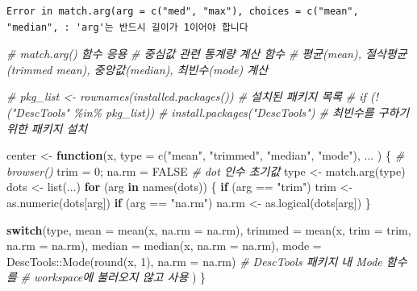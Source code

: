\documentclass[
  11pt,
]{krantz}
\newenvironment{Shaded}{\begin{snugshade}}{\end{snugshade}}
\newcommand{\AttributeTok}[1]{\textcolor[rgb]{0.61,0.61,0.61}{#1}}
\newcommand{\CommentTok}[1]{\textcolor[rgb]{0.37,0.37,0.37}{\textit{#1}}}
\newcommand{\ConstantTok}[1]{\textcolor[rgb]{0,0,0}{#1}}
\newcommand{\ControlFlowTok}[1]{\textcolor[rgb]{0.27,0.27,0.27}{\textbf{#1}}}
\newcommand{\DecValTok}[1]{\textcolor[rgb]{0.06,0.06,0.06}{#1}}
\newcommand{\FunctionTok}[1]{\textcolor[rgb]{0,0,0}{#1}}
\newcommand{\NormalTok}[1]{#1}
\newcommand{\OtherTok}[1]{\textcolor[rgb]{0.37,0.37,0.37}{#1}}
\newcommand{\SpecialCharTok}[1]{\textcolor[rgb]{0,0,0}{#1}}
\newcommand{\StringTok}[1]{\textcolor[rgb]{0.5,0.5,0.5}{#1}}
\begin{document}
\begin{verbatim}
Error in match.arg(arg = c("med", "max"), choices = c("mean", "median", : 'arg'는 반드시 길이가 1이어야 합니다
\end{verbatim}

\normalsize

\footnotesize

\begin{Shaded}
\begin{Highlighting}[]
\CommentTok{\# match.arg() 함수 응용}
\CommentTok{\# 중심값 관련 통계량 계산 함수}
\CommentTok{\# 평균(mean), 절삭평균(trimmed mean), 중앙값(median), 최빈수(mode) 계산}

\CommentTok{\# pkg\_list \textless{}{-} rownames(installed.packages()) \# 설치된 패키지 목록}
\CommentTok{\# if (!("DescTools" \%in\% pkg\_list)) }
\CommentTok{\#   install.packages("DescTools") \# 최빈수를 구하기 위한 패키지 설치}

\NormalTok{center }\OtherTok{\textless{}{-}} \ControlFlowTok{function}\NormalTok{(x, }
                   \AttributeTok{type =} \FunctionTok{c}\NormalTok{(}\StringTok{"mean"}\NormalTok{, }\StringTok{"trimmed"}\NormalTok{, }\StringTok{"median"}\NormalTok{, }\StringTok{"mode"}\NormalTok{), }
\NormalTok{                   ...}
\NormalTok{                   ) }
\NormalTok{\{}
  \CommentTok{\# browser()}
\NormalTok{  trim }\OtherTok{=} \DecValTok{0}\NormalTok{; na.rm }\OtherTok{=} \ConstantTok{FALSE} \CommentTok{\# dot 인수 초기값}
\NormalTok{  type }\OtherTok{\textless{}{-}} \FunctionTok{match.arg}\NormalTok{(type)}
\NormalTok{  dots }\OtherTok{\textless{}{-}} \FunctionTok{list}\NormalTok{(...)}
  \ControlFlowTok{for}\NormalTok{ (arg }\ControlFlowTok{in} \FunctionTok{names}\NormalTok{(dots)) \{}
    \ControlFlowTok{if}\NormalTok{ (arg }\SpecialCharTok{==} \StringTok{"trim"}\NormalTok{) trim }\OtherTok{\textless{}{-}} \FunctionTok{as.numeric}\NormalTok{(dots[arg])}
    \ControlFlowTok{if}\NormalTok{ (arg }\SpecialCharTok{==} \StringTok{"na.rm"}\NormalTok{) na.rm }\OtherTok{\textless{}{-}} \FunctionTok{as.logical}\NormalTok{(dots[arg])}
\NormalTok{  \} }
  
  \ControlFlowTok{switch}\NormalTok{(type, }
         \AttributeTok{mean =} \FunctionTok{mean}\NormalTok{(x, }\AttributeTok{na.rm =}\NormalTok{ na.rm),}
         \AttributeTok{trimmed =} \FunctionTok{mean}\NormalTok{(x, }\AttributeTok{trim =}\NormalTok{ trim, }\AttributeTok{na.rm =}\NormalTok{ na.rm),}
         \AttributeTok{median =} \FunctionTok{median}\NormalTok{(x, }\AttributeTok{na.rm =}\NormalTok{ na.rm),}
         \AttributeTok{mode =}\NormalTok{ DescTools}\SpecialCharTok{::}\FunctionTok{Mode}\NormalTok{(}\FunctionTok{round}\NormalTok{(x, }\DecValTok{1}\NormalTok{), }\AttributeTok{na.rm =}\NormalTok{ na.rm)}
         \CommentTok{\# DescTools 패키지 내 Mode 함수를 }
         \CommentTok{\# workspace에 불러오지 않고 사용}
\NormalTok{         )}
\NormalTok{\}}


\end{Highlighting}
\end{Shaded}
\end{document}
